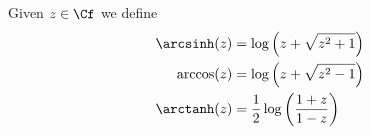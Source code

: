 \documentclass[../mmf.tex]{subfiles}
\begin{document}
\begin{dfn}
	Given $z\in\Cf$ we define
	\begin{equation}
		\begin{aligned}
			\arcsinh(z)&=\log\left( z+\sqrt{z^2+1} \right)\\
			\arccos(z)&=\log\left( z+\sqrt{z^2-1} \right)\\
			\arctanh(z)&=\frac{1}{2}\log\left( \frac{1+z}{1-z} \right)
		\end{aligned}
		\label{eq:inversehypfunc}
	\end{equation}
\end{dfn}
\end{document}
